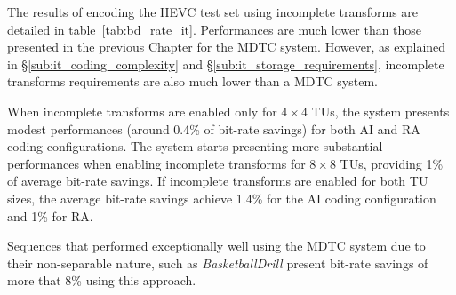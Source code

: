 \documentclass[11pt,a4paper,openright,twoside]{book}
\numberwithin{equation}{section} %
\numberwithin{figure}{section} %
\numberwithin{table}{section} %
\begin{document}
The results of encoding the \ac{HEVC} test set using incomplete transforms are
detailed in table~\ref{tab:bd_rate_it}.
Performances are much lower than those presented in the previous Chapter for
the \ac{MDTC} system.
However, as explained in \S\ref{sub:it_coding_complexity} and
\S\ref{sub:it_storage_requirements}, incomplete transforms requirements are
also much lower than a \ac{MDTC} system.

When incomplete transforms are enabled only for $4\times4$ \acp{TU}, the
system presents modest performances (around 0.4\% of bit-rate savings) for
both \ac{AI} and \ac{RA} coding configurations.
The system starts presenting more substantial performances when enabling
incomplete transforms for $8\times8$ \acp{TU}, providing 1\% of average
bit-rate savings.
If incomplete transforms are enabled for both \ac{TU} sizes, the average
bit-rate savings achieve 1.4\% for the \ac{AI} coding configuration and 1\%
for \ac{RA}.

Sequences that performed exceptionally well using the \ac{MDTC} system due to
their non-separable nature, such as \emph{BasketballDrill} present bit-rate
savings of more that 8\% using this approach.
\end{document}
